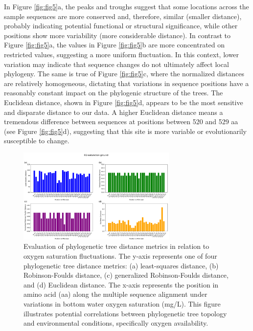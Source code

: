 In Figure \ref{fig:fig5}a, the peaks and troughs suggest that some locations across the sample sequences are more conserved and, therefore, similar (smaller distance), probably indicating potential functional or structural significance, while other positions show more variability (more considerable distance). In contrast to Figure \ref{fig:fig5}a, the values in Figure \ref{fig:fig5}b are more concentrated on restricted values, suggesting a more uniform fluctuation. In this context, lower variation may indicate that sequence changes do not ultimately affect local phylogeny. The same is true of Figure \ref{fig:fig5}c, where the normalized distances are relatively homogeneous, dictating that variations in sequence positions have a reasonably constant impact on the phylogenic structure of the trees. The Euclidean distance, shown in Figure \ref{fig:fig5}d, appears to be the most sensitive and disparate distance to our data. A higher Euclidean distance means a tremendous difference between sequences at positions between 520 and 529 aa (see Figure \ref{fig:fig5}d), suggesting that this site is more variable or evolutionarily susceptible to change. 

\begin{figure}[]
    \centering
    \includegraphics[width=0.7\textwidth]{figure6.png}
    \caption{Evaluation of phylogenetic tree distance metrics in relation to oxygen saturation fluctuations. The y-axis represents one of four phylogenetic tree distance metrics: (a) least-squares distance, (b) Robinson-Foulds distance, (c) generalized Robinson-Foulds distance, and (d) Euclidean distance. The x-axis represents the position in amino acid (aa) along the multiple sequence alignment under variations in bottom water oxygen saturation (mg/L). This figure illustrates potential correlations between phylogenetic tree topology and environmental conditions, specifically oxygen availability. \label{fig:fig6}}
\end{figure}

